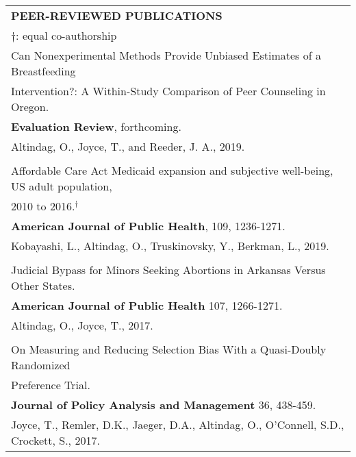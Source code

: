 \documentclass[12 pt]{article}
\begin{document}
\begin{longtable}{ccccc}
\multicolumn{5}{l}{\textbf{PEER-REVIEWED PUBLICATIONS}} \\ 
 \multicolumn{5}{l}{\footnotesize{$\dagger$: equal co-authorship}} \\[2 pt]

   \multicolumn{5}{l}{Can Nonexperimental Methods Provide Unbiased Estimates of a Breastfeeding} \\
  \multicolumn{5}{l}{Intervention?: A Within-Study Comparison of Peer Counseling in Oregon. } \\
    \multicolumn{5}{l}{\textbf{Evaluation Review}, forthcoming.} \\
 \multicolumn{5}{l}{Altindag, O., Joyce, T., and Reeder, J. A., 2019.} \\



 \\ 

  \multicolumn{5}{l}{Affordable Care Act Medicaid expansion and subjective well-being, US adult population, } \\
    \multicolumn{5}{l}{2010 to 2016.$^{\dagger}$} \\
   \multicolumn{5}{l}{\textbf{American Journal of Public Health}, 109, 1236-1271.} \\
   \multicolumn{5}{l}{Kobayashi, L., Altindag, O., Truskinovsky, Y., Berkman, L., 2019.}  \\

\\

   \multicolumn{5}{l}{Judicial Bypass for Minors Seeking Abortions in Arkansas Versus Other States.} \\
    \multicolumn{5}{l}{\textbf{American Journal of Public Health} 107, 1266-1271. 
} \\
    \multicolumn{5}{l}{Altindag, O., Joyce, T., 2017.}  \\
 
\\

   \multicolumn{5}{l}{On Measuring and Reducing Selection Bias With a Quasi-Doubly Randomized} \\
      \multicolumn{5}{l}{Preference Trial.} \\
     \multicolumn{5}{l}{\textbf{Journal of Policy Analysis and Management} 36, 438-459. } \\
      \multicolumn{5}{l}{Joyce, T., Remler, D.K., Jaeger, D.A., Altindag, O., O'Connell, S.D., Crockett, S., 2017. } \\


\end{longtable}
\end{document}
